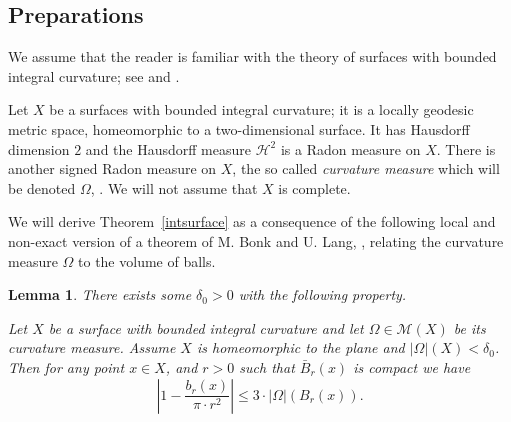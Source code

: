 \documentclass[12pt,leqno,intlimits]{amsart}
\numberwithin{equation}{section}
\newtheorem{lem}[thm]{Lemma}
\theoremstyle{definition}
\theoremstyle{remark}
\newcommand{\tref}[1]{Theorem~\ref{#1}}
\begin{document}
\subsection{Preparations} 
We assume that the reader is familiar with the theory of surfaces with bounded integral curvature; see \cite{AZ} and \cite{Reshetnyak-GeomIV}.

Let $X$ be a surfaces with bounded integral curvature;
it is a locally geodesic metric space, homeomorphic to a two-dimensional surface.
It has Hausdorff dimension $2$ and the Hausdorff measure $\mathcal H^2$ is a Radon measure on $X$. There is another signed Radon measure on $X$, the so called \emph{curvature measure} which will be denoted $\Omega$, \cite[Section 8]{Reshetnyak-GeomIV}.
We will not assume that $X$ is complete.

We will derive \tref{intsurface} as a consequence of the following local and non-exact %
version of a theorem of M. Bonk and U. Lang, \cite{Bonk-Lang}, relating the curvature measure $\Omega$ to the volume of balls.

{\color{red}

\begin{lem} \label{lem:bl}
There exists some $\delta _0>0$ with the following property.

Let $X$ be a surface with bounded integral curvature and let $\Omega\in \mathcal M(X)$ be its curvature measure.
Assume $X$ is homeomorphic to the plane and $| \Omega|(X) < \delta _0$.
Then for any point $x\in X$, and $r>0$ such that
$\bar B_{r} (x)$ is compact we have
$$\left|1- \frac {b_r(x)} {\pi{\cdot}r^2} \right| \leq 3 \cdot |\Omega |( B_{r} (x)).$$
\end{lem}

}
\end{document}
